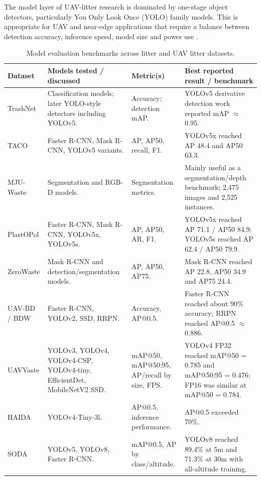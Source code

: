 The model layer of UAV-litter research is dominated by one-stage object detectors, particularly You Only Look Once (YOLO) family models. This is appropriate for UAV and near-edge applications that require a balance between detection accuracy, inference speed, model size and power use \cite{kraft2021uavvaste,bartolo2026litterreview,ultralytics_detect_docs}.

\begin{table}[H]
\centering
\scriptsize
\begin{tabularx}{\textwidth}{p{}p{}p{}X}
\toprule
\textbf{Dataset} & \textbf{Models tested / discussed} & \textbf{Metric(s)} & \textbf{Best reported result / benchmark} \\
\midrule
TrashNet & Classification models; later YOLO-style detectors including YOLOv5. & Accuracy; detection mAP. & YOLOv5 derivative detection work reported mAP $\approx$ 0.95. \\
\addlinespace
TACO & Faster R-CNN, Mask R-CNN, YOLOv5 variants. & AP, AP50, recall, F1. & YOLOv5x reached AP 48.4 and AP50 63.3. \\
\addlinespace
MJU-Waste & Segmentation and RGB-D models. & Segmentation metrics. & Mainly useful as a segmentation/depth benchmark; 2,475 images and 2,525 instances. \\
\addlinespace
PlastOPol & Faster R-CNN, Mask R-CNN, YOLOv5x, YOLOv5s. & AP, AP50, AR, F1. & YOLOv5x reached AP 71.1 / AP50 84.9; YOLOv5s reached AP 62.4 / AP50 79.9. \\
\addlinespace
ZeroWaste & Mask R-CNN and detection/segmentation models. & AP, AP50, AP75. & Mask R-CNN reached AP 22.8, AP50 34.9 and AP75 24.4. \\
\addlinespace
UAV-BD / BDW & Faster R-CNN, YOLOv2, SSD, RRPN. & Accuracy, AP@0.5. & Faster R-CNN reached about 90\% accuracy; RRPN reached AP@0.5 $\approx$ 0.886. \\
\addlinespace
UAVVaste & YOLOv3, YOLOv4, YOLOv4-CSP, YOLOv4-tiny, EfficientDet, MobileNetV2 SSD. & mAP@50, mAP@50:95, AP/recall by size, FPS. & YOLOv4 FP32 reached mAP@50 = 0.785 and mAP@50:95 = 0.476; FP16 was similar at mAP@50 = 0.784. \\
\addlinespace
HAIDA & YOLOv4-Tiny-3l. & AP@0.5, inference performance. & AP@0.5 exceeded 70\%. \\
\addlinespace
SODA & YOLOv5, YOLOv8, Faster R-CNN. & mAP@0.5, AP by class/altitude. & YOLOv8 reached 89.4\% at 5m and 71.3\% at 30m with all-altitude training. \\
\bottomrule
\end{tabularx}
\caption{Model evaluation benchmarks across litter and UAV litter datasets.}
\label{tab:model_benchmarks}
\end{table}

